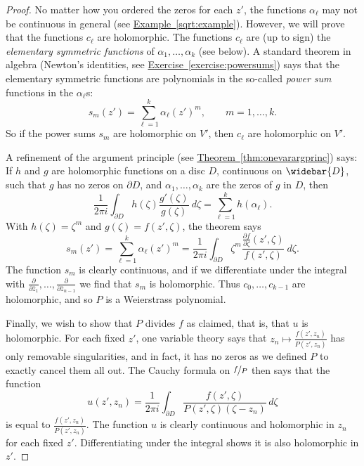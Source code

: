 \documentclass[12pt,openany]{book}
\newcommand{\myindex}[1]{#1\index{#1}}
\theoremstyle{plain}
\theoremstyle{remark}
\theoremstyle{definition}
\theoremstyle{exercise}
\theoremstyle{example}
\newcommand{\exerciseref}[1]{\hyperref[#1]{Exercise~\ref*{#1}}}
\newcommand{\exampleref}[1]{\hyperref[#1]{Example~\ref*{#1}}}
\newcommand{\thmref}[1]{\hyperref[#1]{Theorem~\ref*{#1}}}
\begin{document}
\begin{proof}
No matter how you ordered the zeros for each $z'$,
the functions $\alpha_\ell$ may not be continuous in general (see
\exampleref{sqrt:example}).  However,
we will prove that the functions $c_\ell$ are holomorphic.  The functions
$c_\ell$ are
(up to sign)
the \emph{elementary symmetric functions}
of $\alpha_1,\ldots,\alpha_k$ (see below).  A standard
theorem in algebra
(Newton's identities, see \exerciseref{exercise:powersums})
says that the elementary symmetric functions are
polynomials in the so-called \emph{\myindex{power sum}} functions
in the $\alpha_\ell$s:
\begin{equation*}
s_m(z') = \sum_{\ell=1}^k \alpha_\ell{(z')}^m , \qquad m = 1,\ldots,k.
\end{equation*}
So if the power sums $s_m$ are holomorphic on $V'$, then
$c_\ell$ are holomorphic on $V'$.

A refinement of the argument principle (see \thmref{thm:onevarargprinc}) says:
If $h$ and $g$ are
holomorphic functions on a disc $D$, continuous on $\widebar{D}$,
such that $g$ has no zeros on $\partial D$, and $\alpha_1,\ldots,\alpha_k$
are the zeros of $g$ in $D$, then
\begin{equation*}
\frac{1}{2 \pi i}
\int_{\partial D} h(\zeta) \frac{g'(\zeta)}{g(\zeta)} ~d\zeta
= \sum_{\ell=1}^k h(\alpha_\ell) .
\end{equation*}
With $h(\zeta) = \zeta^m$ and $g(\zeta)=f(z',\zeta)$, the theorem says
\begin{equation*}
s_m(z') =
\sum_{\ell=1}^k \alpha_\ell{(z')}^m
=
\frac{1}{2\pi i}
\int_{\partial D}
\zeta^m
\frac{\frac{\partial f}{\partial \zeta} (z',\zeta)}{f(z',\zeta)} ~d\zeta .
\end{equation*}
The function $s_m$ is clearly continuous, and if we
differentiate under the integral
with $\frac{\partial}{\partial\bar{z}_1}, \ldots,
\frac{\partial}{\partial\bar{z}_{n-1}}$
we find that $s_m$
is holomorphic.  Thus $c_0,\ldots,c_{k-1}$ are holomorphic, and
so $P$ is a Weierstrass polynomial.

Finally, we wish to show that $P$ divides $f$ as claimed, that is,
that $u$ is holomorphic.
For each fixed $z'$, one variable theory says that
$z_n \mapsto \frac{f(z',z_n)}{P(z',z_n)}$ has only removable singularities,
and in fact, it has no zeros as we defined $P$
to exactly cancel them all out.
The Cauchy
formula on $\nicefrac{f}{P}$ then says that the function
\begin{equation*}
u(z',z_n) =
\frac{1}{2\pi i}
\int_{\partial D} \frac{f(z',\zeta)}{P(z',\zeta)(\zeta-z_n)} \,
d\zeta
\end{equation*}
is equal to $\frac{f(z',z_n)}{P(z',z_n)}$.
The function $u$ is clearly continuous and holomorphic in $z_n$
for each fixed $z'$.
Differentiating under the integral shows it is also holomorphic in $z'$.
\end{proof}
\end{document}
